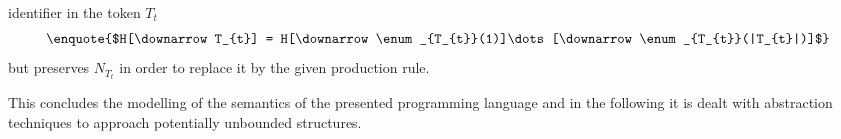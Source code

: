 	identifier in the token $T_{t}$
	\begin{equation*}
		\text{\enquote{$H[\downarrow T_{t}] = H[\downarrow\enum_{T_{t}}(1)]\dots
		[\downarrow\enum_{T_{t}}(|T_{t}|)]$}}
	\end{equation*}
	but preserves $N_{T_{t}}$ in order to replace it by the given production
	rule.
	\begin{prooftree}
	\end{prooftree}
	This concludes the modelling of the semantics of the presented programming
	language and in the following it is dealt with abstraction techniques to
	approach potentially unbounded structures.
